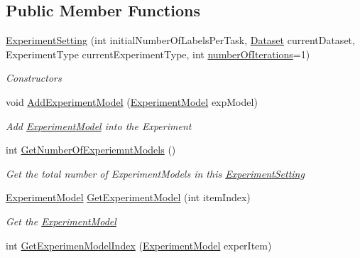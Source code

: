 \subsection*{Public Member Functions}
\begin{DoxyCompactItemize}
\item 
\hyperlink{class_acrive_crowd_g_u_i_1_1_experiment_setting_a81eb83f4f013fa648a85f1d4679f4e2b}{Experiment\+Setting} (int initial\+Number\+Of\+Labels\+Per\+Task, \hyperlink{class_acrive_crowd_g_u_i_1_1_dataset}{Dataset} current\+Dataset, Experiment\+Type current\+Experiment\+Type, int \hyperlink{class_acrive_crowd_g_u_i_1_1_experiment_setting_a21043775ebb676571dd367a3d2afabf0}{number\+Of\+Iterations}=1)
\begin{DoxyCompactList}\small\item\em Constructors \end{DoxyCompactList}\item 
void \hyperlink{class_acrive_crowd_g_u_i_1_1_experiment_setting_accac06f5f7865951d5cb4ec1dda3967f}{Add\+Experiment\+Model} (\hyperlink{class_acrive_crowd_g_u_i_1_1_experiment_model}{Experiment\+Model} exp\+Model)
\begin{DoxyCompactList}\small\item\em Add \hyperlink{class_acrive_crowd_g_u_i_1_1_experiment_model}{Experiment\+Model} into the Experiment \end{DoxyCompactList}\item 
int \hyperlink{class_acrive_crowd_g_u_i_1_1_experiment_setting_a9aeeebea3838b28f3cc11e3d5a2e34da}{Get\+Number\+Of\+Experiemnt\+Models} ()
\begin{DoxyCompactList}\small\item\em Get the total number of Experiment\+Models in this \hyperlink{class_acrive_crowd_g_u_i_1_1_experiment_setting}{Experiment\+Setting} \end{DoxyCompactList}\item 
\hyperlink{class_acrive_crowd_g_u_i_1_1_experiment_model}{Experiment\+Model} \hyperlink{class_acrive_crowd_g_u_i_1_1_experiment_setting_a6c7c73315c38f2438b72a5c3b8775cc1}{Get\+Experiment\+Model} (int item\+Index)
\begin{DoxyCompactList}\small\item\em Get the \hyperlink{class_acrive_crowd_g_u_i_1_1_experiment_model}{Experiment\+Model} \end{DoxyCompactList}\item 
int \hyperlink{class_acrive_crowd_g_u_i_1_1_experiment_setting_af746ceed9324c22c7797a8767997dffe}{Get\+Experimen\+Model\+Index} (\hyperlink{class_acrive_crowd_g_u_i_1_1_experiment_model}{Experiment\+Model} exper\+Item)

\end{DoxyCompactItemize}
